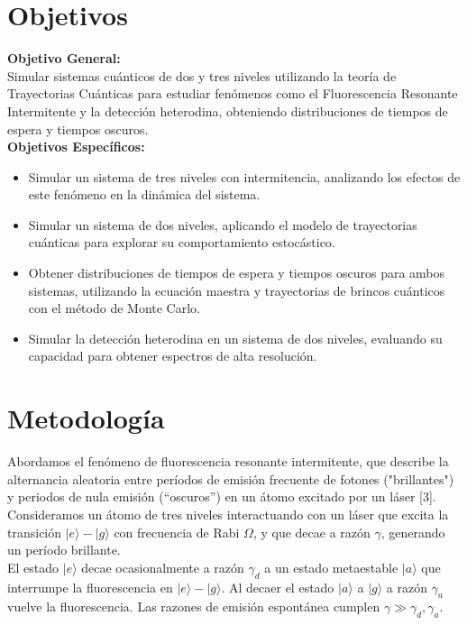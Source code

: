 \documentclass[12pt]{report}
\begin{document}
\section*{Objetivos}

\textbf{Objetivo General:} \\
Simular sistemas cuánticos de dos y tres niveles utilizando la teoría de Trayectorias Cuánticas para estudiar fenómenos como el Fluorescencia Resonante Intermitente y la detección heterodina, obteniendo distribuciones de tiempos de espera y tiempos oscuros.\\

\textbf{Objetivos Específicos:}
\begin{itemize}
    \item Simular un sistema de tres niveles con intermitencia, analizando los efectos de este fenómeno en la dinámica del sistema.
    \item Simular un sistema de dos niveles, aplicando el modelo de trayectorias cuánticas para explorar su comportamiento estocástico.
    \item Obtener distribuciones de tiempos de espera y tiempos oscuros para ambos sistemas, utilizando la ecuación maestra y trayectorias de brincos cuánticos con el método de Monte Carlo.
    \item Simular la detección heterodina en un sistema de dos niveles, evaluando su capacidad para obtener espectros de alta resolución.
\end{itemize}



\section*{Metodología}

Abordamos el fenómeno de fluorescencia resonante intermitente, que describe la alternancia aleatoria entre per\'iodos de emisión frecuente de fotones ("brillantes") y periodos de nula emisión (``oscuros'') en un átomo excitado por un láser [3]. \\

Consideramos un átomo de tres niveles interactuando con un láser que excita la transici\'on 
$|e \rangle - |g \rangle$ con frecuencia de Rabi $\Omega$, y que decae a raz\'on $\gamma$, generando un per\'iodo brillante. 
\\
El estado $|e \rangle$ decae ocasionalmente a raz\'on $\gamma_d$ a un estado metaestable $|a \rangle$ que interrumpe la fluorescencia en $|e \rangle - |g \rangle$. Al decaer el estado $|a \rangle$ a $|g \rangle$ a raz\'on $\gamma_a$ vuelve la fluorescencia. Las razones de emisi\'on espont\'anea cumplen 
$\gamma \gg \gamma_d,\gamma_a$.
\\
\end{document}

